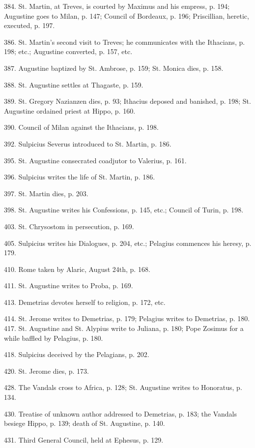 384.
St. Martin, at Treves, is courted by
Maximus and his empress, p. 194; Augustine goes to Milan, p.
147; Council of Bordeaux, p. 196; Priscillian, heretic,
executed, p. 197.

386.
St. Martin's second visit to Treves; he
communicates with the Ithacians, p. 198; etc.; Augustine
converted, p. 157, etc.

387.
Augustine baptized by St. Ambrose, p. 159; St.
Monica dies, p. 158.

388.
St. Augustine settles at Thagaste, p. 159.

389.
St. Gregory Nazianzen dies, p. 93; Ithacius
deposed and banished, p. 198; St. Augustine ordained priest at
Hippo, p. 160.

390.
Council of Milan against the Ithacians, p. 198.

392.
Sulpicius Severus introduced to St. Martin, p.
186.

395.
St. Augustine consecrated coadjutor to Valerius,
p. 161.

396.
Sulpicius writes the life of St. Martin, p.
186.

397.
St. Martin dies, p. 203.

398.
St. Augustine writes his Confessions, p. 145,
etc.; Council of Turin, p. 198.

403.
St. Chrysostom in persecution, p. 169.

405.
Sulpicius writes his Dialogues, p. 204, etc.;
Pelagius commences his heresy, p. 179.

410.
Rome taken by Alaric, August 24th, p. 168.

411.
St. Augustine writes to Proba, p. 169.

413.
Demetrias devotes herself to religion, p. 172,
etc.

414.
St. Jerome writes to Demetrias, p. 179;
Pelagius writes to Demetrias, p. 180. 417.
St. Augustine and St. Alypius write to Juliana,
p. 180; Pope Zosimus for a while baffled by Pelagius, p. 180.

418.
Sulpicius deceived by the Pelagians, p. 202.

420.
St. Jerome dies, p. 173.

428.
The Vandals cross to Africa, p. 128; St.
Augustine writes to Honoratus, p. 134.

430.
Treatise of unknown author addressed to
Demetrias, p. 183; the Vandals besiege Hippo, p. 139; death of
St. Augustine, p. 140.

431.
Third General Council, held at Ephesus, p. 129.

